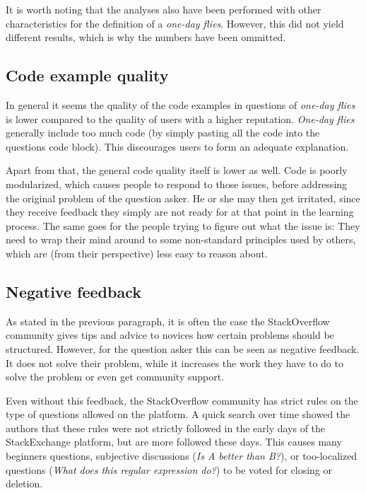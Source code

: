 \documentclass[conference]{IEEEtran}
\newcommand\odf{\emph{one-day flies}\xspace}
\newcommand\Odf{\emph{One-day flies}\xspace}
\begin{document}
It is worth noting that the analyses also have been performed with other characteristics
for the definition of a \odf. However, this did not yield different results, which is why the
numbers have been ommitted.

\subsection{Code example quality}

In general it seems the quality of the code examples in questions of
\odf is lower compared to the quality of users with a higher
reputation. \Odf generally include too much code (by simply pasting
all the code into the questions code block). This discourages users to form an
adequate explanation.

Apart from that, the general code quality itself is lower as well. Code is
poorly modularized, which causes people to respond to those issues, before
addressing the original problem of the question asker. He or she may then get
irritated, since they receive feedback they simply are not ready for at that
point in the learning process. The same goes for the people trying to figure
out what the issue is: They need to wrap their mind around to some non-standard
principles used by others, which are (from their perspective) less easy to
reason about.

\subsection{Negative feedback}

As stated in the previous paragraph, it is often the case the StackOverflow
community gives tips and advice to novices how certain problems should be
structured. However, for the question asker this can be seen as negative
feedback. It does not solve their problem, while it increases the work they
have to do to solve the problem or even get community support.

Even without this feedback, the StackOverflow community has strict rules on the
type of questions allowed on the platform. A quick search over time showed the
authors that these rules were not strictly followed in the early days of the
StackExchange platform, but are more followed these days. This causes many
beginners questions, subjective discussions (\textit{Is A better than B?}), or
too-localized questions (\textit{What does this regular expression do?}) to be
voted for closing or deletion.
\end{document}
